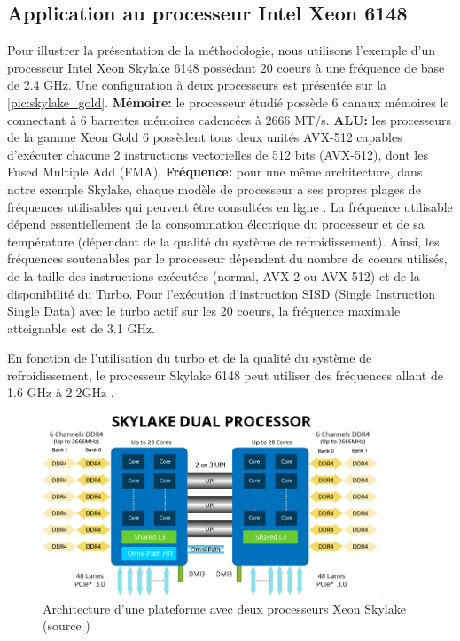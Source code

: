     

\subsection{Application au processeur Intel Xeon 6148}
    
    Pour illustrer la présentation de la méthodologie, nous utilisons l'exemple d'un processeur Intel Xeon Skylake 6148 possédant 20 coeurs à une fréquence de base de 2.4 GHz. Une configuration à deux processeurs est présentée sur la \autoref{pic:skylake_gold}. \textbf{Mémoire: } le processeur étudié possède 6 canaux mémoires le connectant à 6 barrettes mémoires cadencées à 2666 MT/s. \textbf{ALU:} les processeurs de la gamme Xeon Gold 6 possèdent tous deux unités AVX-512 capables d'exécuter chacune 2 instructions vectorielles de 512 bits (AVX-512), dont les Fused Multiple Add (\gls{FMA}). \textbf{Fréquence:} pour une même architecture, dans notre exemple Skylake, chaque modèle de processeur a ses propres plages de fréquences utilisables qui peuvent être consultées en ligne \cite{Wikichipa}. La fréquence utilisable dépend essentiellement de la consommation électrique du processeur et de sa température (dépendant de la qualité du système de refroidissement). Ainsi, les fréquences soutenables par le processeur dépendent du nombre de coeurs utilisés, de la taille des instructions  exécutées (normal, AVX-2 ou AVX-512) et de la disponibilité du Turbo. Pour l'exécution d'instruction SISD (Single Instruction Single Data) avec le turbo actif sur les 20 coeurs, la fréquence maximale atteignable est de 3.1 GHz.  
    
    En fonction de l'utilisation du turbo et de la qualité du système de refroidissement, le processeur Skylake 6148 peut utiliser des fréquences allant de 1.6 GHz à 2.2GHz \cite{Wikichipa}. 
    
    \begin{figure}
        \center
        \includegraphics[width=10cm]{images/skylake_gold.png}
        \caption{\label{pic:skylake_gold} Architecture d'une plateforme avec deux processeurs Xeon Skylake (source \cite{Aspsys})}
    \end{figure}
    
